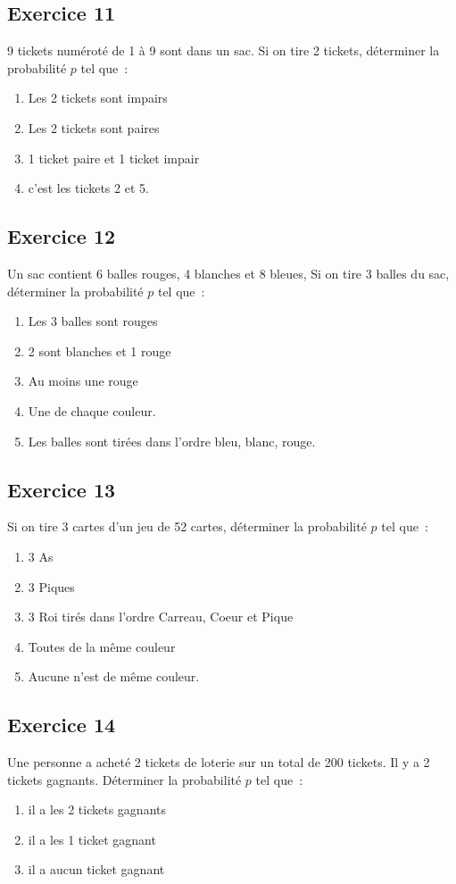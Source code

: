 \documentclass[]{book}
\theoremstyle{definition}
\begin{document}
\subsection*{Exercice 11}
9 tickets num\'erot\'e de 1 \`a 9 sont dans un sac. Si on tire 2 tickets, d\'eterminer la probabilit\'e $p$ tel que\ :
\begin{enumerate}
\item Les 2 tickets sont impairs
\item Les 2 tickets sont paires
\item 1 ticket paire et 1 ticket impair
\item c'est les tickets 2 et 5.
\end{enumerate}

\subsection*{Exercice 12}
Un sac contient 6 balles rouges, 4 blanches et 8 bleues, Si on tire 3 balles du sac, d\'eterminer la probabilit\'e $p$ tel que\ :
\begin{enumerate}
\item Les 3 balles sont rouges
\item 2 sont blanches et 1 rouge 
\item Au moins une rouge
\item Une de chaque couleur.
\item Les balles sont tir\'ees dans l'ordre bleu, blanc, rouge.
\end{enumerate}

\subsection*{Exercice 13}
Si on tire 3 cartes d'un jeu de 52 cartes, d\'eterminer la probabilit\'e $p$ tel que\ :
\begin{enumerate}
\item 3 As
\item 3 Piques
\item 3 Roi tir\'es dans l'ordre Carreau, Coeur et Pique 
\item Toutes de la m\^eme couleur
\item Aucune n'est de m\^eme couleur.
\end{enumerate}

\subsection*{Exercice 14}
Une personne a achet\'e 2 tickets de loterie sur un total de 200 tickets. Il y a 2 tickets gagnants. D\'eterminer la probabilit\'e $p$ tel que\ :
\begin{enumerate}
\item il a les 2 tickets gagnants
\item il a les 1 ticket gagnant
\item il a aucun ticket gagnant
\end{enumerate}
\end{document}
